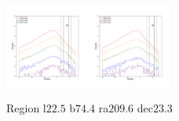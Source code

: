 \documentclass[12pt,prd]{article}
\begin{document}
\begin{figure}[h!]
\includegraphics[width=0.24\textwidth]{../figures/scanning_plotsgaiascan_l22_5_b74_4_ra209_6_dec23_3_npy_16.pdf}
\includegraphics[width=0.24\textwidth]{../figures/scanning_plotsgaiascan_l22_5_b74_4_ra209_6_dec23_3_npy_17.pdf}
\caption{Region l$22.5$ b$74.4$ ra$209.6$ dec$23.3$}
\end{figure}
\end{document}
